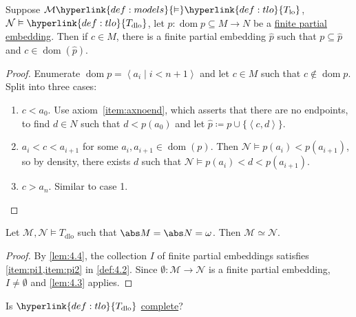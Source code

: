 \documentclass{article}
\let\models\vDash
\DeclareMathOperator{\dom}{dom}
\newcommand{\named}[1]{\textbf{#1}\index{#1}}
\begin{document}
\begin{nlemma}\label{lem:4.4}
  Suppose $\mathcal{M} \hyperlink{def:models}{\models} \hyperlink{def:tlo}{T_{\text{lo}}}$, $\mathcal{N} \models \hyperlink{def:tlo}{T_{\text{dlo}}}$, let $p: \dom p \subseteq M \to N$ be a \hyperlink{def:pe}{finite partial embedding}.
  Then if $c \in M$, there is a finite partial embedding $\hat{p}$ such that $p \subseteq \hat{p}$ and $c \in \dom(\hat{p})$.
\end{nlemma}
\begin{proof}
  Enumerate $\dom p = \left< a_i \mid i < n+1 \right>$ and let $c \in M$ such that $c \not\in \dom p$.
  Split into three cases:
  \begin{enumerate}[label=\arabic*.]
    \item $c < a_0$. Use axiom~\ref{item:axnoend}, which asserts that there are no endpoints, to find $d \in N$ such that $d < p(a_0)$ and let $\hat p \coloneqq p \cup \{ \left< c,d \right> \}$.
    \item $a_i < c < a_{i+1}$ for some $a_i, a_{i+1} \in \dom(p)$.
      Then $\mathcal{N} \models p(a_i) < p(a_{i+1})$, so by density, there exists $d$ such that $\mathcal{N} \models p(a_i) < d < p(a_{i+1})$.
     \item $c > a_n$. Similar to case 1. \qedhere
  \end{enumerate}
\end{proof}

\begin{nthm} \label{thm:4.5}
Let $\mathcal{M}, \mathcal{N} \models T_{\text{dlo}}$ such that $\abs M = \abs N = \omega$. Then $\mathcal M \simeq \mathcal N$.
\end{nthm}

\begin{proof}
By \cref{lem:4.4}, the collection $I$ of finite partial embeddings satisfies  \cref{item:pi1,item:pi2} in \cref{def:4.2}. Since $\emptyset: \mathcal{M} \to \mathcal{N}$ is a finite partial embedding, $I \neq \emptyset$ and \cref{lem:4.3} applies. 
\end{proof}

Is $\hyperlink{def:tlo}{T_{\text{dlo}}}$ \hyperlink{def:complete}{complete}?
\end{document}
